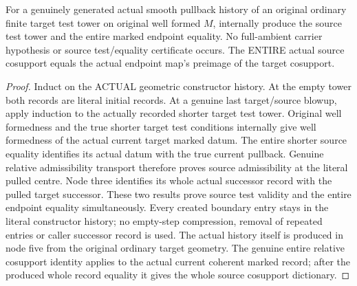 \begin{theorem}
\label{hir:submersion-relative-control-joint-tower}
\leanok
For a genuinely generated actual smooth pullback history of an original
ordinary finite target test tower on original well formed $M$, internally
produce the source test tower and the entire marked endpoint equality.
No full-ambient carrier hypothesis or source test/equality certificate occurs.
The ENTIRE actual source cosupport equals the actual endpoint map's preimage
of the target cosupport.
\end{theorem}
\begin{proof}
Induct on the ACTUAL geometric constructor history. At the empty tower both
records are literal initial records. At a genuine last target/source blowup,
apply induction to the actually recorded shorter target test tower. Original
well formedness and the true shorter target test conditions internally give
well formedness of the actual current target marked datum. The entire
shorter source equality identifies its actual datum with the true current
pullback. Genuine relative admissibility transport therefore proves source
admissibility at the literal pulled centre. Node three identifies its whole
actual successor record with the pulled target successor. These two results
prove source test validity and the entire endpoint equality simultaneously.
Every created boundary entry stays in the literal constructor history; no
empty-step compression, removal of repeated entries or caller successor
record is used. The actual history itself is produced in node five from the
original ordinary target geometry. The genuine entire relative cosupport
identity applies to the actual current coherent marked record; after the
produced whole record equality it gives the whole source cosupport dictionary.
\end{proof}

